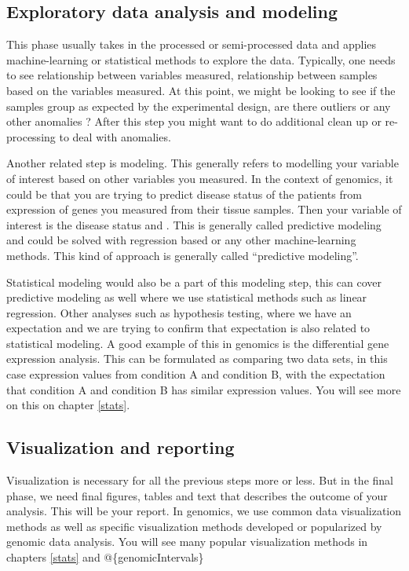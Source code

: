 \documentclass[12pt,]{krantz}
\theoremstyle{definition}
\theoremstyle{definition}
\theoremstyle{definition}
\theoremstyle{remark}
\begin{document}
\hypertarget{exploratory-data-analysis-and-modeling}{%
\subsection{Exploratory data analysis and
modeling}\label{exploratory-data-analysis-and-modeling}}

This phase usually takes in the processed or semi-processed data and
applies machine-learning or statistical methods to explore the data.
Typically, one needs to see relationship between variables measured,
relationship between samples based on the variables measured. At this
point, we might be looking to see if the samples group as expected by
the experimental design, are there outliers or any other anomalies ?
After this step you might want to do additional clean up or
re-processing to deal with anomalies.

Another related step is modeling. This generally refers to modelling
your variable of interest based on other variables you measured. In the
context of genomics, it could be that you are trying to predict disease
status of the patients from expression of genes you measured from their
tissue samples. Then your variable of interest is the disease status and
. This is generally called predictive modeling and could be solved with
regression based or any other machine-learning methods. This kind of
approach is generally called ``predictive modeling''.

Statistical modeling would also be a part of this modeling step, this
can cover predictive modeling as well where we use statistical methods
such as linear regression. Other analyses such as hypothesis testing,
where we have an expectation and we are trying to confirm that
expectation is also related to statistical modeling. A good example of
this in genomics is the differential gene expression analysis. This can
be formulated as comparing two data sets, in this case expression values
from condition A and condition B, with the expectation that condition A
and condition B has similar expression values. You will see more on this
on chapter \ref{stats}.

\hypertarget{visualization-and-reporting}{%
\subsection{Visualization and
reporting}\label{visualization-and-reporting}}

Visualization is necessary for all the previous steps more or less. But
in the final phase, we need final figures, tables and text that
describes the outcome of your analysis. This will be your report. In
genomics, we use common data visualization methods as well as specific
visualization methods developed or popularized by genomic data analysis.
You will see many popular visualization methods in chapters \ref{stats}
and @\{genomicIntervals\}
\end{document}
